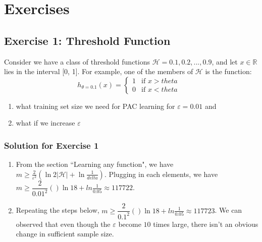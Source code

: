 

\section{Exercises}

\subsection{Exercise 1: Threshold Function}
Consider we have a class of threshold functions $\mathcal{H} = { 0.1 , 0.2 ,..., 0.9 }$, and let $x \in \mathbb R$ lies in the interval [0, 1]. For example, one of the members of  $\mathcal{H}$  is the function:
\[
  h_{\theta = 0.1}(x) =
  \begin{cases}
                                   1 & \text{if $x > theta$ }\\
                                   0 & \text{if $x < theta$ } 
  \end{cases}
\]
\begin{enumerate}
    \item what training set size we need for PAC learning for $\varepsilon = 0.01$ and %
    \item what if we increase $\varepsilon$
\end{enumerate}

\subsubsection{Solution for Exercise 1}
\begin{enumerate}
    \item From the section ``Learning any function", we have $m \geq \frac{2}{\varepsilon^{2}}(\ln2|\mathcal{H}|+\ln \frac{1}{delta})$. Plugging in each elements, we have $m \geq \dfrac{2}{0.01^{2}}()\ln 18 + ln\frac{1}{0.05} \approx 117722$.
    \item Repeating the steps below, $m \geq \dfrac{2}{0.1^{2}}()\ln 18 + ln\frac{1}{0.05} \approx 117723$. We can observed that even though the $\varepsilon$ become $10$ times large, there isn't an obvious change in sufficient sample size.
\end{enumerate}


